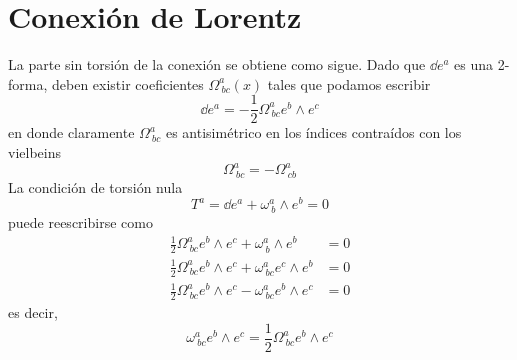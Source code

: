 \section{Conexión de Lorentz}
La parte sin torsión de la conexión se obtiene como sigue. Dado que $\dd e^{a}$ es una 2-forma, deben existir coeficientes $\Omega^{a}_{~ bc}(x)$ tales que podamos escribir
\begin{equation}\label{izau}
  \dd e^{a}=-\frac{1}{2}\Omega^{a}_{~bc} e^{b}\wedge e^{c}
\end{equation}
en donde claramente $\Omega^{a}_{~bc}$ es antisimétrico en los índices contraídos con los vielbeins
\begin{equation}\label{Omega-anti}
  \Omega^{a}_{~bc}=-\Omega^{a}_{~cb}
\end{equation}
La condición de torsión nula
\begin{equation}
  T^{a}=\dd e^{a}+\omega^{a}_{~b}\wedge e^b=0
\end{equation}
puede reescribirse como
\begin{align}
  \frac{1}{2}\Omega^{a}_{~bc}e^b\wedge e^c+\omega^{a}_{~b}\wedge e^b&=0\\
  \frac{1}{2}\Omega^{a}_{~bc}e^b\wedge e^c+\omega^{a}_{~bc}e^c\wedge e^b&=0\\
  \frac{1}{2}\Omega^{a}_{~bc}e^b\wedge e^c-\omega^{a}_{~bc}e^b\wedge e^c&=0
\end{align}
es decir,
\begin{equation}
  \omega^{a}_{~bc}e^b\wedge e^c=\frac{1}{2}\Omega^{a}_{~bc}e^b\wedge e^c
\end{equation}


